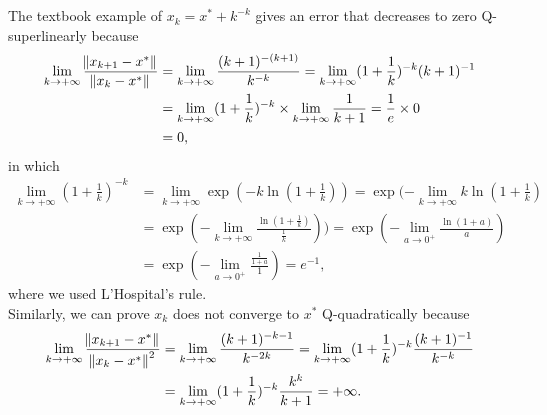 \documentclass[11pt]{article}
\begin{document}
\maketitle
\section{}
The textbook example of $x_k=x^*+k^{-k}$ gives an error that decreases to zero Q-superlinearly because \begin{equation}\begin{split}\lim_{k\to+\infty}\frac{\norm{x_{k+1}-x^*}}{\norm{x_{k}-x^*}}&=\lim_{k\to+\infty}\frac{(k+1)^{-(k+1)}}{k^{-k}}=\lim_{k\to+\infty}(1+\frac1k)^{-k}(k+1)^{-1}\\&=\lim_{k\to+\infty}(1+\frac1k)^{-k}\times\lim_{k\to+\infty}\frac1{k+1}=\frac1e\times0\\&=0,\end{split}\nonumber\end{equation} 
in which \begin{equation} \begin{split}\lim_{k\to+\infty} (1+\frac1k)^{-k} &= \lim_{k\to+\infty}\exp(-k\ln(1+\frac1k)) = \exp(-\lim_{k\to+\infty}k\ln(1+\frac1k)\\&=\exp(-\lim_{k\to+\infty} \frac{\ln(1+\frac1k)}{\frac1k}))=\exp(-\lim_{a\to0^+}\frac{\ln(1+a)}a)\\&=\exp(-\lim_{a\to 0^+}\frac{\frac1{1+a}}1)=e^{-1}, \end{split}\nonumber\end{equation} where we used L'Hospital's rule. \\[0.5cm] 
Similarly, we can prove ${x_k}$ does not converge to $x^*$ Q-quadratically because \begin{equation}\begin{split}\lim_{k\to+\infty}\frac{\norm{x_{k+1}-x^*}}{\norm{x_{k}-x^*}^2}&=\lim_{k\to+\infty}\frac{(k+1)^{-k-1}}{k^{-2k}}=\lim_{k\to+\infty}(1+\frac1k)^{-k}\frac{(k+1)^{-1}}{k^{-k}}\\&=\lim_{k\to+\infty}(1+\frac1k)^{-k}\frac{k^k}{k+1}=+\infty.\end{split}\nonumber\end{equation}
\end{document}
